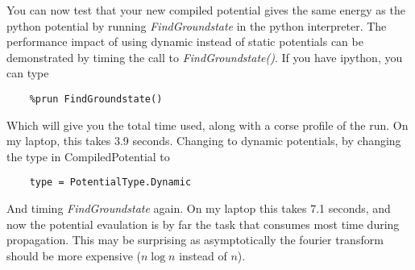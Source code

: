 You can now test that your new compiled potential gives the same energy as the python potential by running
\textit{FindGroundstate} in the python interpreter. The performance impact of using dynamic instead of static potentials
can be demonstrated by timing the call to \textit{FindGroundstate()}. If you have ipython, you can type
\begin{verbatim}
	%prun FindGroundstate()
\end{verbatim}
Which will give you the total time used, along with a corse profile of the run. On my laptop, this takes 3.9 seconds. 
Changing to dynamic potentials, by changing the type in CompiledPotential to
\begin{verbatim}
	type = PotentialType.Dynamic
\end{verbatim}
And timing \textit{FindGroundstate} again. On my laptop this takes 7.1 seconds, and now the potential evaulation is by far the 
task that consumes most time during propagation. This may be surprising as asymptotically the fourier transform should be more
expensive ($n \log n$ instead of $n$).
